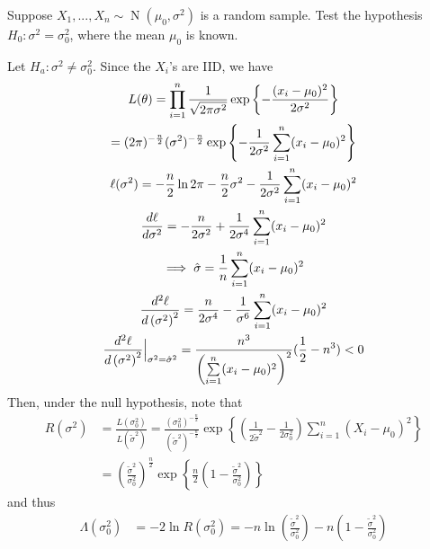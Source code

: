 \documentclass[notoc,notitlepage]{tufte-book}
\DeclareMathOperator{\Nor}{N }
\begin{document}
\begin{eg}[Example 7.5]
  Suppose $X_1, ..., X_n \sim \Nor\left(\mu_0, \sigma^2\right)$ is a random sample. Test the hypothesis $H_0 : \sigma^2 = \sigma_0^2$, where the mean $\mu_0$ is known.
\end{eg}

\begin{solution}
  Let $H_a : \sigma^2 \neq \sigma_0^2$. Since the $X_i$'s are IID, we have
  \begin{gather*}
    L(\theta) = \prod_{i=1}^{n} \frac{1}{\sqrt{2 \pi \sigma^2}} \exp\left\{ - \frac{(x_i - \mu_0)^2}{2 \sigma^2} \right\} \\
    = (2 \pi)^{- \frac{n}{2}} (\sigma^2)^{-\frac{n}{2}} \exp\left\{ - \frac{1}{2 \sigma^2} \sum_{i=1}^{n} (x_i - \mu_0)^2 \right\} \\
    \ell(\sigma^2) = - \frac{n}{2} \ln 2 \pi - \frac{n}{2} \sigma^2 - \frac{1}{2 \sigma^2} \sum_{i=1}^{n} (x_i - \mu_0)^2 \\
    \frac{d \ell}{d \sigma^2} = - \frac{n}{2 \sigma^2} + \frac{1}{2 \sigma^4} \sum_{i=1}^{n} (x_i - \mu_0)^2 \\
    \implies \hat{\sigma} = \frac{1}{n} \sum_{i=1}^{n} (x_i - \mu_0)^2 \\
    \frac{d^2 \ell}{d\left( \sigma^2 \right)^2} = \frac{n}{2 \sigma^4} - \frac{1}{\sigma^6} \sum_{i=1}^{n} (x_i - \mu_0)^2 \\
    \frac{d^2 \ell}{d\left( \sigma^2 \right)^2} \Big|_{\sigma^2 = \hat{\sigma}^2}^{} = \frac{n^3}{\left( \sum\limits_{i=1}^{n} (x_i - \mu_0)^2 \right)^2} ( \frac{1}{2} - n^3 ) < 0
  \end{gather*}
  Then, under the null hypothesis, note that
  \begin{align*}
    R(\sigma^2) &= \frac{L(\sigma_0^2)}{L(\tilde{\sigma}^2)} = \frac{\left( \sigma_0^2 \right)^{-\frac{n}{2}}}{\left( \tilde{\sigma}^2 \right)^{-\frac{n}{2}}} \exp\left\{ \left( \frac{1}{2 \tilde{\sigma}^2} - \frac{1}{2 \sigma_0^2} \right) \sum_{i=1}^{n} (X_i - \mu_0)^2 \right\} \\
                &= \left( \frac{\tilde{\sigma}^2}{\sigma_0^2} \right)^{\frac{n}{2}} \exp\left\{ \frac{n}{2} \left( 1 - \frac{\tilde{\sigma}^2}{\sigma_0^2} \right) \right\}
  \end{align*}
  and thus
  \begin{align*}
    \Lambda(\sigma_0^2) &= -2\ln R(\sigma_0^2) = - n \ln \left( \frac{\tilde{\sigma}^2}{\sigma_0^2} \right) - n \left(1 - \frac{\tilde{\sigma}^2}{\sigma_0^2}\right) \\

\end{align*}
\end{solution}
\end{document}
